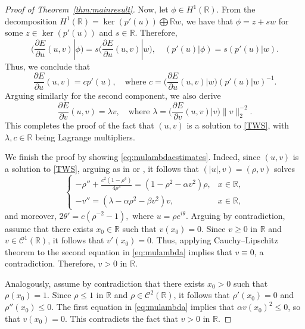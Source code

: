 \documentclass[11pt]{article}
\newcommand{\R}{\mathbb{R}}
\newcommand{\boC}{\mathcal{C}}
\theoremstyle{plain}
\theoremstyle{definition}
\theoremstyle{remark}
\numberwithin{equation}{section}
\begin{document}
{\begin{proof}[Proof of Theorem~\ref{thm:mainresult}]
    Now, let $\phi\in H^1(\R)$. From the decomposition $H^1(\R)=\ker(p'(u))\bigoplus \R w$, we have that $\phi=z+sw$ for some $z\in\ker(p'(u))$ and $s\in\R$. Therefore,
    \[\Big(\frac{\partial E}{\partial u}(u,v)|\phi\Big)=s\Big(\frac{\partial E}{\partial u}(u,v)|w\Big),\quad (p'(u)|\phi)=s(p'(u)|w).\]
    Thus, we conclude that
    \[\frac{\partial E}{\partial u}(u,v)=cp'(u),\quad\text{where }c=\Big(\frac{\partial E}{\partial u}(u,v)|w\Big)(p'(u)|w)^{-1}.\]
    Arguing similarly for the second component, we also derive
    \[\frac{\partial E}{\partial v}(u,v)=\lambda v,\quad\text{where }\lambda=\Big(\frac{\partial E}{\partial v}(u,v)|v\Big)\|v\|_2^{-2}.\]
    This completes the proof of the fact that $(u,v)$ is a solution to \eqref{TWS}, with $\lambda,c\in\R$ being Lagrange multipliers.

    We finish the proof by showing \eqref{eq:mulambdaestimates}. Indeed, since $(u,v)$ is a solution to \eqref{TWS}, arguing as in \cite{Maris2006} or \cite{dLMar2022}, it follows that $(|u|,v)=(\rho,v)$ solves 
    \begin{equation}\label{eq:mulambda}
    \begin{cases}
    \displaystyle -\rho'' + \frac{c^2 (1-\rho^4)}{4\rho^3}=(1-\rho^2-\alpha v^2)\rho, &x\in\R,
    \\
    -v''=(\lambda - \alpha \rho^2 - \beta v^2)v, &x\in\R,
    \end{cases}
    \end{equation}
{and moreover, $2\theta'=c(\rho^{-2}-1),$ where $u=\rho e^{i\theta}$.} Arguing by contradiction, assume that there exists $x_0\in\R$ such that $v(x_0)=0$. Since $v\geq 0$ in $\R$ and $v\in\boC^1(\R)$, it follows that $v'(x_0)=0$. Thus, applying Cauchy--Lipschitz theorem to the second equation in \eqref{eq:mulambda} implies that $v\equiv 0$, a contradiction. Therefore, $v>0$ in $\R$. 

Analogously, assume by contradiction that there exists $x_0>0$ such that $\rho(x_0)=1$. Since $\rho\leq 1$ in $\R$ and $\rho\in\boC^2(\R)$, it follows that $\rho'(x_0)=0$ and $\rho''(x_0)\leq 0$. The first equation in \eqref{eq:mulambda} implies that $\alpha v(x_0)^2\leq 0$, so that $v(x_0)=0$. This contradicts the fact that $v>0$ in $\R$.


\end{proof}}
\end{document}

